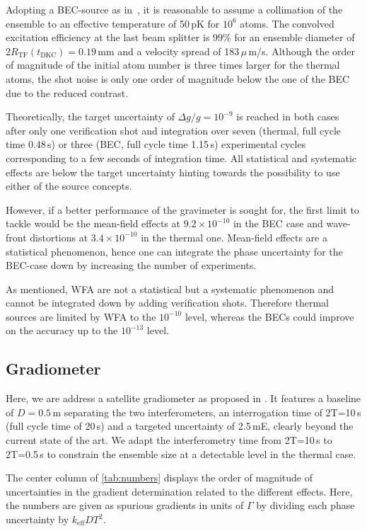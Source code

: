 Adopting a BEC-source as in~\cite{Rudolph2015}, it is reasonable to assume a collimation of the ensemble to an effective temperature of 50\,pK for $10^6$ atoms. The convolved excitation efficiency at the last beam splitter is 99\% for an ensemble diameter of $2R_\text{TF}(t_\text{DKC})=0.19$\,mm and a velocity spread of 183\,$\mu$\,m/s. Although the order of magnitude of the initial atom number is three times larger for the thermal atoms, the shot noise is only one order of magnitude below the one of the BEC due to the reduced contrast.

Theoretically, the target uncertainty of $\Delta g/g=10^{-9}$ is reached in both cases after only one verification shot and integration over seven (thermal, full cycle time 0.48\,s) or three (BEC, full cycle time 1.15\,s) experimental cycles corresponding to a few seconds of integration time. 
All statistical and systematic effects are below the target uncertainty hinting towards the possibility to use either of the source concepts.

However, if a better performance of the gravimeter is sought for, the first limit to tackle would be the mean-field effects at $9.2\times10^{-10}$ in the BEC case and wave-front distortions at $3.4\times10^{-10}$ in the thermal one. 
Mean-field effects are a statistical phenomenon, hence one can integrate the phase uncertainty for the BEC-case down by increasing the number of experiments. 

As mentioned, WFA are not a statistical but a systematic phenomenon and cannot be integrated down by adding verification shots. Therefore thermal sources are limited by WFA to the $10^{-10}$ level, whereas
the BECs could improve on the accuracy up to the $10^{-13}$ level.

%
\subsection{Gradiometer}
Here, we are address a satellite gradiometer as proposed in \cite{Trimeche2019}. It features a baseline of $D=0.5$\,m separating the two interferometers, an interrogation time of 2T=10\,s (full cycle time of 20\,s) and a targeted uncertainty of 2.5\,mE, clearly beyond the current state of the art. We adapt the interferometry time from 2T=10\,s to 2T=0.5\,s to constrain the ensemble size at a detectable level in the thermal case.

The center column of \autoref{tab:numbers} displays the order of magnitude of uncertainties in the gradient determination related to the different effects. Here, the numbers are given as spurious gradients in units of $\Gamma$ by dividing each phase uncertainty by $k_\text{eff}DT^2$.


